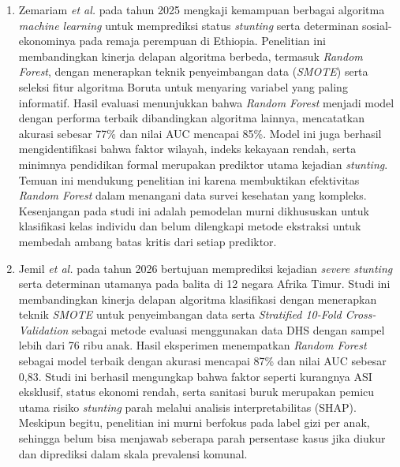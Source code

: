 \begin{enumerate}
    \item Zemariam \textit{et al.} \cite{zemariam2025prediction} pada tahun 2025 mengkaji kemampuan berbagai algoritma \textit{machine learning} untuk memprediksi status \textit{stunting} serta determinan sosial-ekonominya pada remaja perempuan di Ethiopia. Penelitian ini membandingkan kinerja delapan algoritma berbeda, termasuk \textit{Random Forest}, dengan menerapkan teknik penyeimbangan data (\textit{SMOTE}) serta seleksi fitur algoritma Boruta untuk menyaring variabel yang paling informatif. Hasil evaluasi menunjukkan bahwa \textit{Random Forest} menjadi model dengan performa terbaik dibandingkan algoritma lainnya, mencatatkan akurasi sebesar 77\% dan nilai AUC mencapai 85\%. Model ini juga berhasil mengidentifikasi bahwa faktor wilayah, indeks kekayaan rendah, serta minimnya pendidikan formal merupakan prediktor utama kejadian \textit{stunting}. Temuan ini mendukung penelitian ini karena membuktikan efektivitas \textit{Random Forest} dalam menangani data survei kesehatan yang kompleks. Kesenjangan pada studi ini adalah pemodelan murni dikhususkan untuk klasifikasi kelas individu dan belum dilengkapi metode ekstraksi untuk membedah ambang batas kritis dari setiap prediktor.

    \item Jemil \textit{et al.} \cite{jemil2026predicting} pada tahun 2026 bertujuan memprediksi kejadian \textit{severe stunting} serta determinan utamanya pada balita di 12 negara Afrika Timur. Studi ini membandingkan kinerja delapan algoritma klasifikasi dengan menerapkan teknik \textit{SMOTE} untuk penyeimbangan data serta \textit{Stratified 10-Fold Cross-Validation} sebagai metode evaluasi menggunakan data DHS dengan sampel lebih dari 76 ribu anak. Hasil eksperimen menempatkan \textit{Random Forest} sebagai model terbaik dengan akurasi mencapai 87\% dan nilai AUC sebesar 0,83. Studi ini berhasil mengungkap bahwa faktor seperti kurangnya ASI eksklusif, status ekonomi rendah, serta sanitasi buruk merupakan pemicu utama risiko \textit{stunting} parah melalui analisis interpretabilitas (SHAP). Meskipun begitu, penelitian ini murni berfokus pada label gizi per anak, sehingga belum bisa menjawab seberapa parah persentase kasus jika diukur dan diprediksi dalam skala prevalensi komunal.


\end{enumerate}
